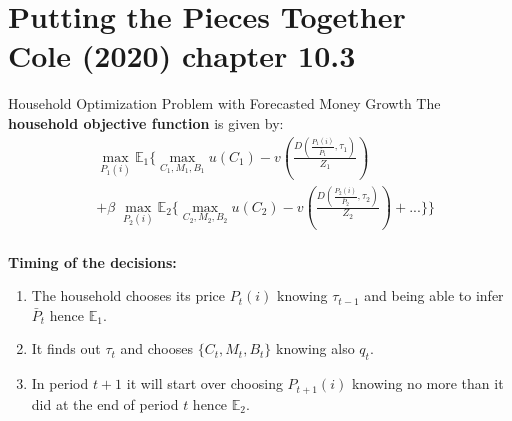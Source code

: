 \documentclass[10pt,c,aspectratio=1610,handout]{beamer}
\begin{document}
\section{Putting the Pieces Together\\{\small Cole (2020) chapter 10.3}}%
\begin{frame}{Household Optimization Problem with Forecasted Money Growth}%
  The \textbf{household objective function} is given by:%
  \begin{align*}%
    & \max_{P_1(i)} \mathbb{E}_1 \Bigg \{ \max_{C_1,M_1,B_1} u(C_{1})-v\left( \frac{D\left( \frac{P_{1}(i)}{\bar{P}_{1}}, \tau_1 \right)}{Z_{1}} \right) \\%
    & + \beta \; \max_{P_2(i)} \mathbb{E}_2 \Bigg \{ \max_{C_2,M_2,B_2} u(C_{2})-v\left( \frac{D\left( \frac{P_{2}(i)}{\bar{P}_{2}},\tau_2 \right)}{Z_{2}} \right) + ... \Bigg\} \Bigg\}%
  \end{align*}\\%
  \vspace*{0.2in}%
  \pause%
  \textbf{Timing of the decisions:}%
  \pause%
  \begin{enumerate}%
    \item The household chooses its price $P_{t}(i)$ knowing $\tau_{t-1}$ and being able to infer $\bar{P}_t$ hence $\mathbb{E}_1$.%
    \pause%
    \item It finds out $\tau_{t}$ and chooses $\{C_t, M_t, B_t\}$ knowing also $q_t$.%
    \pause%
    \item In period $t+1$ it will start over choosing $P_{t+1}(i)$ knowing no more than it did at the end of period $t$ hence $\mathbb{E}_2$.%
  \end{enumerate}%
\end{frame}%
\end{document}
